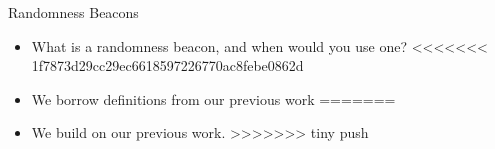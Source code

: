 \begin{frame}{Randomness Beacons}
    \begin{itemize}
        \item What is a randomness beacon, and when would you use one?
<<<<<<< 1f7873d29cc29ec6618597226770ac8febe0862d
        \item We borrow definitions from our previous work
=======
        \item We build on our previous work.
>>>>>>> tiny push
    \end{itemize}
\end{frame}
